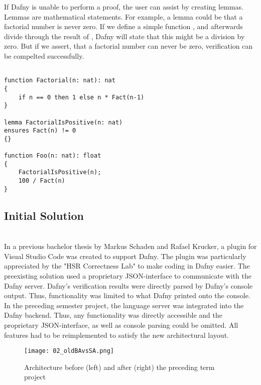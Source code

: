 If Dafny is unable to perform a proof, the user can assist by creating lemmas.
Lemmas are mathematical statements.
For example, a lemma could be that a factorial number is never zero.
If we define a simple function , and afterwards divide through the result of , Dafny will state that this might be a division by zero.
But if we assert, that a factorial number can never be zero, verification can be compelted successfully.
\begin{lstlisting}[language=dafny, caption={Lemmas}, captionpos=b, label={lst:lemma}]

function Factorial(n: nat): nat
{
    if n == 0 then 1 else n * Fact(n-1)
}

lemma FactorialIsPositive(n: nat)
ensures Fact(n) != 0
{}

function Foo(n: nat): float
{
    FactorialIsPositive(n);
    100 / Fact(n)
}
\end{lstlisting}

\subsection{Initial Solution}
\\
\label{section:introduction:initialsolution}
In a previous bachelor thesis by Markus Schaden and Rafael Krucker, a plugin for Visual Studio Code
was created to support Dafny.\cite{ba} The plugin was particularly appreciated by the "HSR Correctness Lab"\cite{correctnessLab} to make coding in Dafny easier.
The preexisting solution used a proprietary JSON-interface to communicate with the Dafny server.
Dafny's verification results were directly parsed by Dafny's console output.
Thus, functionality was limited to what Dafny printed onto the console.\\
In the preceding semester project\cite{sa}, the language server was integrated into the Dafny backend.
Thus, any functionality was directly accessible and the proprietary JSON-interface, as well as console parsing could be omitted.
All features had to be reimplemented to satisfy the new architectural layout.

\begin{figure}[h]
    \centering
    \texttt{[image: 02\_oldBAvsSA.png]}
    \caption{Architecture before (left) and after (right) the preceding term project}
    \label{fig:oldBAvsSA}
\end{figure}

